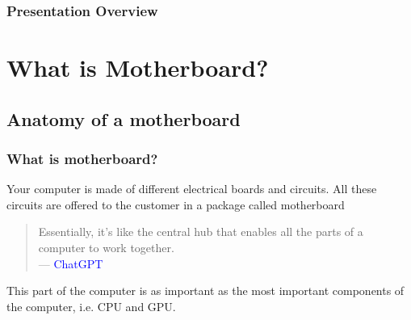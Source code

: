 \documentclass[
	12pt, %
]{beamer}
\begin{document}
\begin{frame}
	\frametitle{Presentation Overview} %
	
	\tableofcontents %
\end{frame}


\section{What is Motherboard?} %


\subsection{Anatomy of a motherboard}

\begin{frame}
	\frametitle{What is motherboard?}
	
	Your computer is made of different electrical boards and circuits. All these circuits are offered to the customer \alert{in a package called motherboard}
	
	\bigskip %
	
	\begin{quote}
		Essentially, it's like the central hub that enables all the parts of a computer to work together.\\
		--- \textcolor{blue}{ChatGPT}
	\end{quote}
	
	\bigskip %
	
	This part of the computer is as important as the most important components of the computer, i.e. CPU and GPU.
\end{frame}

\end{document}
